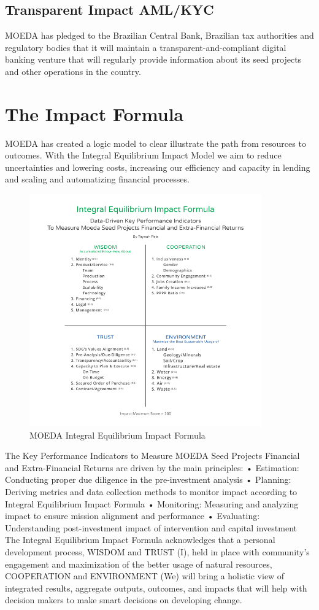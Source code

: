 \documentclass{article}
\begin{document}
\subsection {Transparent Impact AML/KYC}

MOEDA has pledged to the Brazilian Central Bank, Brazilian tax authorities and regulatory bodies that it will maintain a transparent-and-compliant digital banking venture that will regularly provide information about its seed projects and other operations in the country.        

\section {The Impact Formula}

MOEDA has created a logic model to clear illustrate the path from resources to outcomes. With the Integral Equilibrium Impact Model we aim to reduce uncertainties and lowering costs, increasing our efficiency and capacity in lending and scaling and automatizing financial processes. 

\begin{figure}[h]
    \centering
    \includegraphics[width=10cm,keepaspectratio,]{moeda-formula}
    \caption{MOEDA Integral Equilibrium Impact Formula}
\end{figure}

The Key Performance Indicators to Measure MOEDA Seed Projects Financial and Extra-Financial Returns are driven by the main principles:  
•	Estimation: Conducting proper due diligence in the pre-investment analysis
•	Planning: Deriving metrics and data collection methods to monitor impact according to Integral Equilibrium Impact Formula
•	Monitoring: Measuring and analyzing impact to ensure mission alignment and performance 
•	Evaluating: Understanding post-investment impact of intervention and capital investment 
The Integral Equilibrium Impact Formula acknowledges that a personal development process, WISDOM and TRUST (I), held in place with community’s engagement and maximization of the better usage of natural resources, COOPERATION and ENVIRONMENT (We) will bring a holistic view of integrated results, aggregate outputs, outcomes, and impacts that will help with decision makers to make smart decisions on developing change. 
\end{document}
